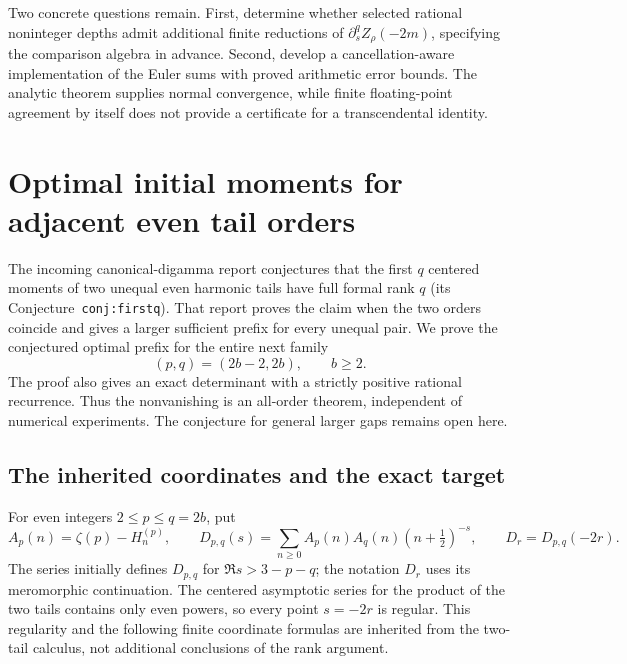\documentclass[11pt,a4paper]{article}
\numberwithin{equation}{section}
\theoremstyle{definition}
\theoremstyle{remark}
\begin{document}
Two concrete questions remain. First, determine whether selected rational
noninteger depths admit additional finite reductions of
$\partial_s^qZ_\rho(-2m)$, specifying the comparison algebra in advance.
Second, develop a cancellation-aware implementation of the Euler sums
with proved arithmetic error bounds. The analytic theorem supplies
normal convergence, while finite floating-point agreement by itself
does not provide a certificate for a transcendental identity.




\section{Optimal initial moments for adjacent even tail orders}
\label{ar:section}

The incoming canonical-digamma report \cite{Fifth} conjectures that the first $q$
centered moments of two unequal even harmonic tails have full formal
rank $q$ (its Conjecture~\texttt{conj:firstq}). That report proves the
claim when the two orders coincide and gives a larger sufficient prefix
for every unequal pair. We prove the conjectured optimal prefix for the
entire next family
\[
                 (p,q)=(2b-2,2b),\qquad b\ge2.
\]
The proof also gives an exact determinant with a strictly positive
rational recurrence. Thus the nonvanishing is an all-order theorem,
independent of numerical experiments. The conjecture for general larger
gaps remains open here.

\subsection{The inherited coordinates and the exact target}

For even integers $2\le p\le q=2b$, put
\[
 A_p(n)=\zeta(p)-H_n^{(p)},\qquad
 D_{p,q}(s)=\sum_{n\ge0}
     A_p(n)A_q(n)(n+\tfrac12)^{-s},\qquad
 D_r=D_{p,q}(-2r).
\]
The series initially defines $D_{p,q}$ for
$\Re s>3-p-q$; the notation $D_r$ uses its meromorphic continuation.
The centered asymptotic series for the product of the two tails contains
only even powers, so every point $s=-2r$ is regular. This regularity and
the following finite coordinate formulas are inherited from the two-tail
calculus, not additional conclusions of the rank argument.
\end{document}
